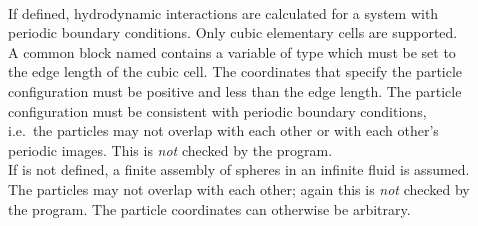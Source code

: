 \begin{description}

\item[]
\\
If defined, hydrodynamic interactions are calculated for a
system with periodic boundary conditions. Only cubic elementary cells
are supported. A common block named  contains a variable
 of type  which must be set to the edge length of
the cubic cell. The coordinates that specify the particle
configuration must be positive and less than the edge length. The
particle configuration must be consistent with periodic boundary
conditions, i.e.\ the particles may not overlap with each other or
with each other's periodic images. This is {\em not} checked by the
program.\\
If  is not defined, a finite assembly of
spheres in an infinite fluid is assumed. The particles may not overlap
with each other; again this is {\em not} checked by the program. The
particle coordinates can otherwise be arbitrary.


\end{description}
